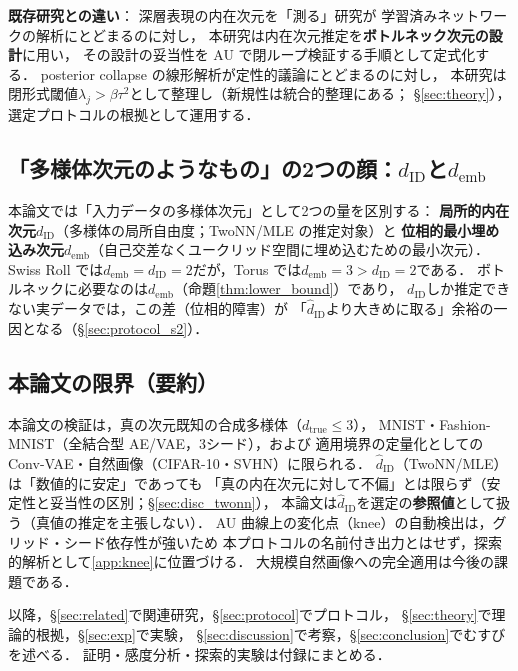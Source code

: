 \documentclass[11pt,a4paper]{jsarticle}
\newcommand{\dID}{d_{\mathrm{ID}}}
\newcommand{\hatdID}{\hat{d}_{\mathrm{ID}}}
\newcommand{\dtrue}{d_{\mathrm{true}}}
\newcommand{\demb}{d_{\mathrm{emb}}}
\begin{document}
\textbf{既存研究との違い}：
深層表現の内在次元を「測る」研究\cite{ansuini2019intrinsic,pope2021intrinsic,valeriani2023geometry}が
学習済みネットワークの解析にとどまるのに対し，
本研究は内在次元推定を\textbf{ボトルネック次元の設計}に用い，
その設計の妥当性を AU で閉ループ検証する手順として定式化する．
posterior collapse の線形解析\cite{lucas2019elbo}が定性的議論にとどまるのに対し，
本研究は閉形式閾値$\lambda_j > \beta\tau^2$として整理し（新規性は統合的整理にある；
§\ref{sec:theory}），選定プロトコルの根拠として運用する．

\subsection{「多様体次元のようなもの」の2つの顔：$\dID$と$\demb$}\label{sec:intro_dim}

本論文では「入力データの多様体次元」として2つの量を区別する：
\textbf{局所的内在次元}$\dID$（多様体の局所自由度；TwoNN/MLE の推定対象）と
\textbf{位相的最小埋め込み次元}$\demb$（自己交差なくユークリッド空間に埋め込むための最小次元）．
Swiss Roll では$\demb = \dID = 2$だが，Torus では$\demb = 3 > \dID = 2$である．
ボトルネックに必要なのは$\demb$（命題\ref{thm:lower_bound}）であり，
$\dID$しか推定できない実データでは，この差（位相的障害）が
「$\hatdID$より大きめに取る」余裕の一因となる（§\ref{sec:protocol_s2}）．

\subsection{本論文の限界（要約）}\label{sec:intro_limits}

本論文の検証は，真の次元既知の合成多様体（$\dtrue \leq 3$），
MNIST・Fashion-MNIST（全結合型 AE/VAE，3シード），および
適用境界の定量化としての Conv-VAE・自然画像（CIFAR-10・SVHN）に限られる．
$\hatdID$（TwoNN/MLE）は「数値的に安定」であっても
「真の内在次元に対して不偏」とは限らず（安定性と妥当性の区別；§\ref{sec:disc_twonn}），
本論文は$\hatdID$を選定の\textbf{参照値}として扱う（真値の推定を主張しない）．
AU 曲線上の変化点（knee）の自動検出は，グリッド・シード依存性が強いため
本プロトコルの名前付き出力とはせず，探索的解析として\ref{app:knee}に位置づける．
大規模自然画像への完全適用は今後の課題である．

以降，§\ref{sec:related}で関連研究，§\ref{sec:protocol}でプロトコル，
§\ref{sec:theory}で理論的根拠，§\ref{sec:exp}で実験，
§\ref{sec:discussion}で考察，§\ref{sec:conclusion}でむすびを述べる．
証明・感度分析・探索的実験は付録にまとめる．
\end{document}
